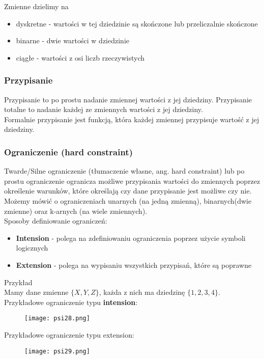 \documentclass[a4paper,15pt]{article}
\begin{document}
Zmienne dzielimy na 
\begin{itemize}
\item dyskretne - wartości w tej dziedzinie są skończone lub przeliczalnie skończone
\item binarne - dwie wartości w dziedzinie
\item ciągłe - wartości z osi liczb rzeczywistych
\end{itemize}

\subsubsection{Przypisanie}
Przypisanie to po prostu nadanie zmiennej wartości z jej dziedziny. Przypisanie totalne to nadanie każdej ze zmiennych wartości z jej dziedziny. \\
Formalnie przypisanie jest funkcją, która każdej zmiennej przypisuje wartość z jej dziedziny. 

\subsubsection{Ograniczenie (hard constraint)}

Twarde/Silne ograniczenie (tłumaczenie własne, ang. hard constraint) lub po prostu ograniczenie ogranicza możliwe przypisania wartości do zmiennych poprzez określenie warunków, które określają czy dane przypisanie jest możliwe czy nie. Możemy mówić o ograniczeniach unarnych (na jedną zmienną), binarnych(dwie zmienne) oraz k-arnych (na wiele zmiennych). \\

Sposoby definiowanie ograniczeń:
\begin{itemize}
\item \textbf{Intension} - polega na zdefiniowaniu ograniczenia poprzez użycie symboli logicznych
\item \textbf{Extension} - polega na wypisaniu wszystkich przypisań, które są poprawne
\end{itemize}  

Przykład \\
Mamy dane zmienne $\{X,Y,Z\}$, każda z nich ma dziedzinę $\{1,2,3,4\}$.  \\
Przykładowe ograniczenie typu \textbf{intension}: 
\begin{figure}[H]
\centerline{\texttt{[image: psi28.png]}}
\end{figure}

Przykładowe ograniczenie typu extension:
\begin{figure}[H]
\centerline{\texttt{[image: psi29.png]}}
\end{figure}
\end{document}
